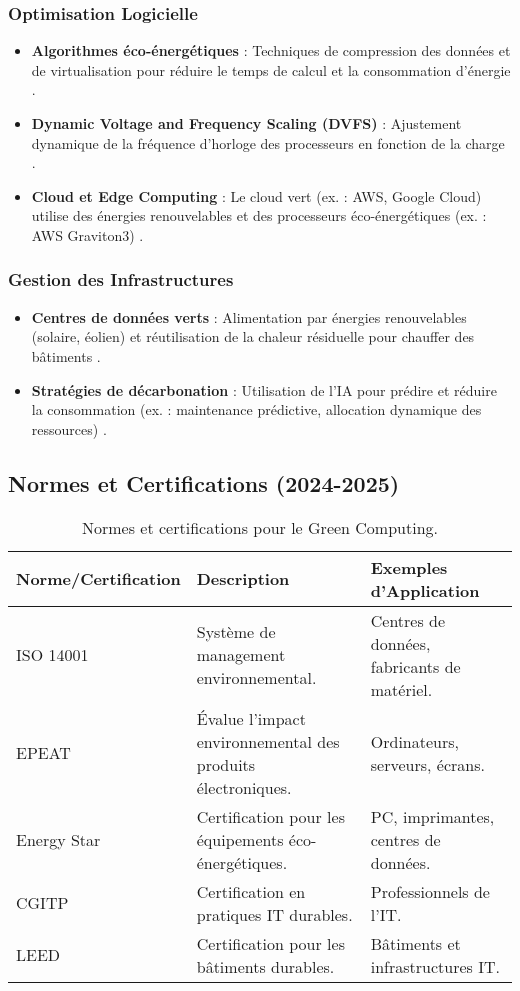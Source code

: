 \documentclass[10pt,a4paper]{article}
\begin{document}
\subsubsection{Optimisation Logicielle}
\begin{itemize}
    \item \textbf{Algorithmes éco-énergétiques} : Techniques de compression des données et de virtualisation pour réduire le temps de calcul et la consommation d'énergie \cite{acm2025}.
    \item \textbf{Dynamic Voltage and Frequency Scaling (DVFS)} : Ajustement dynamique de la fréquence d'horloge des processeurs en fonction de la charge \cite{diversedaily2024}.
    \item \textbf{Cloud et Edge Computing} : Le cloud vert (ex. : AWS, Google Cloud) utilise des énergies renouvelables et des processeurs éco-énergétiques (ex. : AWS Graviton3) \cite{cloudwards2025}.
\end{itemize}

\subsubsection{Gestion des Infrastructures}
\begin{itemize}
    \item \textbf{Centres de données verts} : Alimentation par énergies renouvelables (solaire, éolien) et réutilisation de la chaleur résiduelle pour chauffer des bâtiments \cite{nature2025}.
    \item \textbf{Stratégies de décarbonation} : Utilisation de l'IA pour prédire et réduire la consommation (ex. : maintenance prédictive, allocation dynamique des ressources) \cite{frontiers2025}.
\end{itemize}

\subsection{Normes et Certifications (2024-2025)}
\begin{table}[h]
\centering
\caption{Normes et certifications pour le Green Computing.}
\begin{tabular}{|l|l|l|}
\hline
\textbf{Norme/Certification} & \textbf{Description} & \textbf{Exemples d'Application} \\ \hline
ISO 14001 & Système de management environnemental. & Centres de données, fabricants de matériel. \\ \hline
EPEAT & Évalue l'impact environnemental des produits électroniques. & Ordinateurs, serveurs, écrans. \\ \hline
Energy Star & Certification pour les équipements éco-énergétiques. & PC, imprimantes, centres de données. \\ \hline
CGITP & Certification en pratiques IT durables. & Professionnels de l'IT. \\ \hline
LEED & Certification pour les bâtiments durables. & Bâtiments et infrastructures IT. \\ \hline
\end{tabular}
\label{tab:green_certifications}
\end{table}
\end{document}
